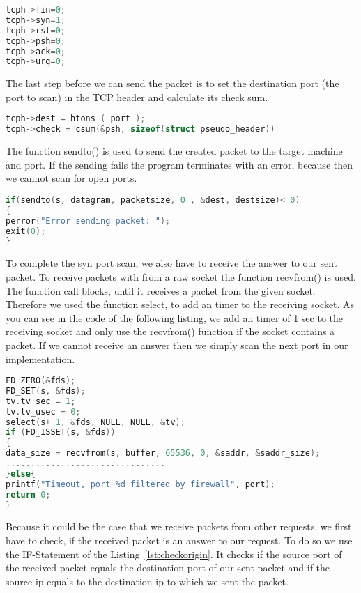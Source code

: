 \begin{lstlisting}[frame= single, language=C, caption= C code to set flags in TCP header]
tcph->fin=0;
tcph->syn=1;
tcph->rst=0;
tcph->psh=0;
tcph->ack=0;
tcph->urg=0;
\end{lstlisting}
The last step before we can send the packet is to set the destination port (the port to scan)  in the TCP header and calculate its check sum.
\begin{lstlisting}[frame= single, language=C, caption= C code to set port and calculate checksum in TCP header]
tcph->dest = htons ( port );
tcph->check = csum(&psh, sizeof(struct pseudo_header))
\end{lstlisting}
The function sendto() is used to send the created packet to the target machine and port. If the sending fails the program terminates with
an error, because then we cannot scan for open ports.
\begin{lstlisting}[frame= single, language=C, caption= C code to set port and calculate checksum in TCP header]
if(sendto(s, datagram, packetsize, 0 , &dest, destsize)< 0)
{
perror("Error sending packet: ");
exit(0);
}
\end{lstlisting}
To complete the syn port scan, we also have to receive the answer to our sent packet. To receive packets with from a raw socket the function recvfrom() is used. The function call blocks, until it
receives a packet from the given socket. Therefore we used the function select, to add an timer to the receiving socket. As you can see in the code of the following listing, we add an timer of 1 sec
to the receiving socket and only use the recvfrom() function if the socket contains a packet. If we cannot receive an answer then we simply scan the next port in our implementation.
\begin{lstlisting}[frame= single, language=C, caption= C code to receive the packet]
FD_ZERO(&fds);
FD_SET(s, &fds);
tv.tv_sec = 1;
tv.tv_usec = 0;
select(s+ 1, &fds, NULL, NULL, &tv);		
if (FD_ISSET(s, &fds))
{
data_size = recvfrom(s, buffer, 65536, 0, &saddr, &saddr_size);
................................
}else{
printf("Timeout, port %d filtered by firewall", port);
return 0;
}
\end{lstlisting}
Because it could be the case that we receive packets from other requests, we first have to check, if the received packet
is an answer to our request. To do so we use the IF-Statement of the Listing~\ref{lst:checkorigin}. It checks if the source port of the received packet equals the destination port of our sent packet and
if the source ip equals to the destination ip to which we sent the packet.
